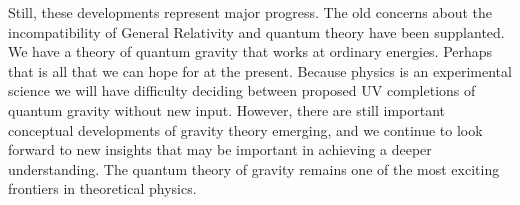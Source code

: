 \documentclass[11pt,a4paper]{article}
\begin{document}
Still, these developments represent major progress. The old concerns about the incompatibility of General Relativity and quantum theory have been supplanted.   We have a theory of quantum gravity that works at ordinary energies. Perhaps that is all that we can hope for at the present. Because physics is an experimental science we will have difficulty deciding between proposed UV completions of quantum gravity without new input. However, there are still important conceptual developments of gravity theory emerging, and we continue to look forward to new insights that may be important in achieving a deeper understanding. The quantum theory of gravity remains one of the most exciting frontiers in theoretical physics.





\end{document}

